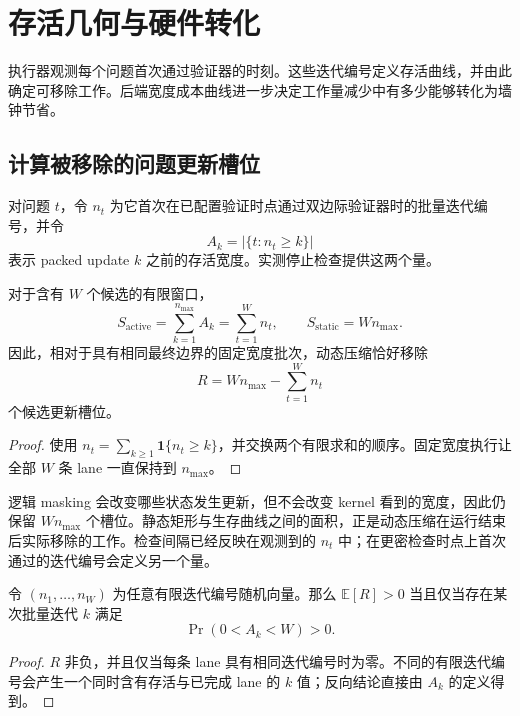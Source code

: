 \section{存活几何与硬件转化}
\label{sec:cost-hypothesis}

执行器观测每个问题首次通过验证器的时刻。这些迭代编号定义存活曲线，并由此确定可移除工作。后端宽度成本曲线进一步决定工作量减少中有多少能够转化为墙钟节省。

\subsection{计算被移除的问题更新槽位}

对问题 $t$，令 $n_t$ 为它首次在已配置验证时点通过双边际验证器时的批量迭代编号，并令
\begin{equation}
A_k=\bigl|\{t:n_t\geq k\}\bigr|
\label{eq:survival-width}
\end{equation}
表示 packed update $k$ 之前的存活宽度。实测停止检查提供这两个量。

\begin{proposition}[问题更新槽位核算]
对于含有 $W$ 个候选的有限窗口，
\begin{equation}
S_{\mathrm{active}}
=\sum_{k=1}^{n_{\max}}A_k
=\sum_{t=1}^{W}n_t,
\qquad
S_{\mathrm{static}}=Wn_{\max}.
\label{eq:slot-identity}
\end{equation}
因此，相对于具有相同最终边界的固定宽度批次，动态压缩恰好移除
\begin{equation}
R=Wn_{\max}-\sum_{t=1}^{W}n_t
\label{eq:removable-slots}
\end{equation}
个候选更新槽位。
\end{proposition}
\begin{proof}
使用 $n_t=\sum_{k\geq1}\mathbf 1\{n_t\geq k\}$，并交换两个有限求和的顺序。固定宽度执行让全部 $W$ 条 lane 一直保持到 $n_{\max}$。
\end{proof}

逻辑 masking 会改变哪些状态发生更新，但不会改变 kernel 看到的宽度，因此仍保留 $Wn_{\max}$ 个槽位。静态矩形与生存曲线之间的面积，正是动态压缩在运行结束后实际移除的工作。检查间隔已经反映在观测到的 $n_t$ 中；在更密检查时点上首次通过的迭代编号会定义另一个量。

\begin{proposition}[任务无关的机会条件]
令 $(n_1,\ldots,n_W)$ 为任意有限迭代编号随机向量。那么 $\mathbb E[R]>0$ 当且仅当存在某次批量迭代 $k$ 满足
\begin{equation}
\Pr(0<A_k<W)>0.
\label{eq:joint-iteration-condition}
\end{equation}
\end{proposition}
\begin{proof}
$R$ 非负，并且仅当每条 lane 具有相同迭代编号时为零。不同的有限迭代编号会产生一个同时含有存活与已完成 lane 的 $k$ 值；反向结论直接由 $A_k$ 的定义得到。
\end{proof}

